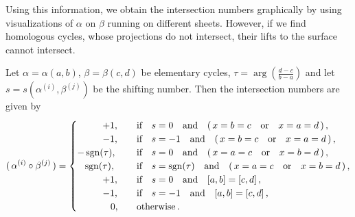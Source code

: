 \documentclass[main.tex]{subfiles}
\begin{document}
     Using this information, we obtain the intersection numbers graphically by using visualizations of $\alpha$ on $\beta$ running on different sheets.
     However, if we find homologous cycles, whose projections do not intersect, their lifts to the surface cannot intersect.
    
    
    \newpage
    \begin{thm}\label{thm:intsec_numb}
      Let $\alpha=\alpha(a,b)$, $\beta=\beta(c,d)$ be elementary cycles, $\tau = \arg\left(\frac{d-c}{b-a}\right)$ and let $s=s(\alpha^{(i)},\beta^{(j)})$ be the
     shifting number. Then the intersection numbers are given by
      \begin{align}
       \begin{split}
        (\,\alpha^{(i)} \circ \beta^{(j)}\,) = 
        \begin{cases}
            \hspace*{0.95cm} +1, \quad & \text{if} \quad s=0 \quad \text{and} \quad (\,x = b = c \quad \text{or} \quad x = a = d\,)\,,\\
	     \hspace*{0.95cm} -1, \quad &\text{if} \quad s=-1 \quad \text{and} \quad (\,x = b = c \quad \text{or} \quad x = a = d\,)\,,\\
          -\operatorname{sgn}(\tau), \quad & \text{if} \quad s=0 \quad \text{and} \quad (\,x = a = c \quad \text{or} \quad x = b = d\,)\,,\\
           \quad\! \operatorname{sgn}(\tau), \quad & \text{if} \quad s=\operatorname{sgn}(\tau) \quad \text{and} \quad (\,x = a = c \quad \text{or} \quad x = b = d\,)\,,\\
          \hspace*{0.95cm} +1, \quad &\text{if} \quad s=0 \quad \text{and} \quad [a,b] = [c,d]\,,\\
          \hspace*{0.95cm} -1, \quad &\text{if} \quad s=-1 \quad \text{and} \quad [a,b] = [c,d]\,,\\
         \hspace*{0.95cm}  \quad\! 0, \quad &\text{otherwise}\,.
        \end{cases}
       \end{split}
      \end{align}
    \end{thm}
	   
\end{document}
